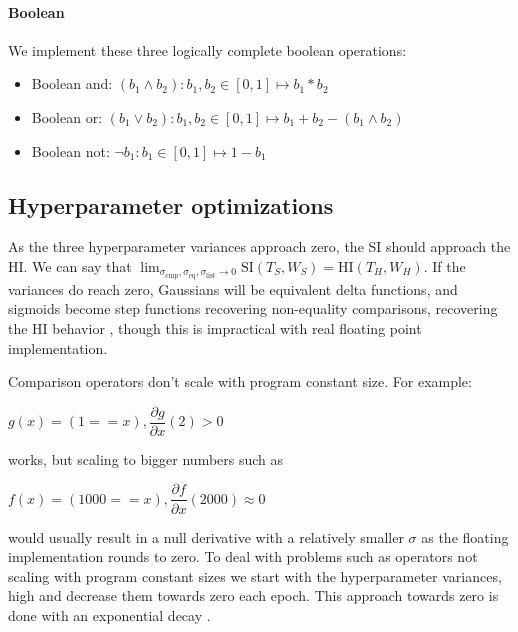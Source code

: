 \documentclass{article}
\begin{document}
\paragraph{Boolean} We implement these three logically complete boolean operations:
\begin{itemize}
  \item Boolean and: $(b_1 \land b_2): b_1, b_2 \in [0, 1] \mapsto b_1 * b_2$
  \item Boolean or: $(b_1 \lor b_2): b_1, b_2 \in [0, 1] \mapsto b_1 + b_2 - (b_1 \land b_2)$
  \item Boolean not: $\neg b_1: b_1 \in [0, 1] \mapsto 1 - b_1$\\
\end{itemize}

\subsection{Hyperparameter optimizations}
As the three hyperparameter variances approach zero, the SI should approach the HI. We can say that $\lim_{\sigma_{\text{cmp}}, \sigma_{\text{eq}}, \sigma_{\text{list}} \rightarrow 0} \text{SI}(T_S, W_S) = \text{HI}(T_H, W_H)$. If the variances do reach zero, Gaussians will be equivalent delta functions, and sigmoids become step functions recovering non-equality comparisons, recovering the HI behavior , though this is impractical with real floating point implementation.

Comparison operators don't scale with program constant size. For example:
\begin{center}
  $g(x) = (1 == x), \dfrac{\partial g}{\partial x} (2) > 0$
\end{center}
works, but scaling to bigger numbers such as
\begin{center}
  $f(x) = (1000 == x), \dfrac{\partial f}{\partial x} (2000) \approx 0$\\
\end{center}
would usually result in a null derivative with a relatively smaller $\sigma$ as the floating implementation rounds to zero. To deal with problems such as operators not scaling with program constant sizes we start with the hyperparameter variances, high and decrease them towards zero each epoch. This approach towards zero is done with an exponential decay \cite{DBLP:journals/corr/abs-1910-07454}.\\

\end{document}
